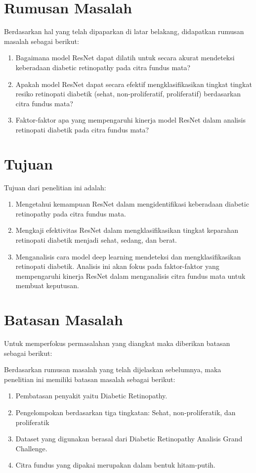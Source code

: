 \section{Rumusan Masalah}
\label{sec:permasalahan}

Berdasarkan hal yang telah dipaparkan di latar belakang, didapatkan rumusan masalah sebagai berikut:
\begin{enumerate}
	\item Bagaimana model ResNet dapat dilatih untuk secara akurat mendeteksi keberadaan diabetic retinopathy pada citra fundus mata?
	\item Apakah model ResNet dapat secara efektif mengklasifikasikan tingkat tingkat resiko retinopati diabetik (sehat, non-proliferatif, proliferatif) berdasarkan citra fundus mata?
	\item Faktor-faktor apa yang mempengaruhi kinerja model ResNet dalam analisis retinopati diabetik pada citra fundus mata?
\end{enumerate}

\section{Tujuan}
\label{sec:Tujuan}

Tujuan dari penelitian ini adalah:
\begin{enumerate}
	\item Mengetahui kemampuan ResNet dalam mengidentifikasi keberadaan diabetic retinopathy pada citra fundus mata.
	\item Mengkaji efektivitas ResNet dalam mengklasifikasikan tingkat keparahan retinopati diabetik menjadi sehat, sedang, dan berat.
	\item Menganalisis cara model deep learning mendeteksi dan mengklasifikasikan retinopati diabetik. Analisis ini akan fokus pada faktor-faktor yang mempengaruhi kinerja ResNet dalam menganalisis citra fundus mata untuk membuat keputusan.
\end{enumerate}

\section{Batasan Masalah}
\label{sec:batasanmasalah}

Untuk memperfokus permasalahan yang diangkat maka diberikan batasan sebagai berikut:

Berdasarkan rumusan masalah yang telah dijelaskan sebelumnya, maka penelitian ini memiliki batasan masalah sebagai berikut:
\begin{enumerate}
	\item Pembatasan penyakit yaitu Diabetic Retinopathy.
	\item Pengelompokan berdasarkan tiga tingkatan: Sehat, non-proliferatik, dan proliferatik
	\item Dataset yang digunakan berasal dari Diabetic Retinopathy Analisis Grand Challenge.
	\item Citra fundus yang dipakai merupakan dalam bentuk hitam-putih.
\end{enumerate}

